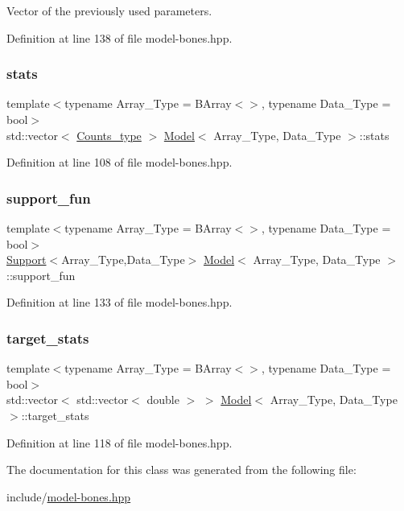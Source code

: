 Vector of the previously used parameters. 



Definition at line 138 of file model-\/bones.\+hpp.

\mbox{\label{class_model_a1816b0dd69226394643dc31916c8645e}} 
\subsubsection{\texorpdfstring{stats}{stats}}
{\footnotesize\ttfamily template$<$typename Array\+\_\+\+Type  = B\+Array$<$$>$, typename Data\+\_\+\+Type  = bool$>$ \\
std\+::vector$<$ \hyperlink{typedefs_8hpp_aee40fa17c1fddb63dd1f2b1470ade95b}{Counts\+\_\+type} $>$ \hyperlink{class_model}{Model}$<$ Array\+\_\+\+Type, Data\+\_\+\+Type $>$\+::stats}



Definition at line 108 of file model-\/bones.\+hpp.

\mbox{\label{class_model_a192302b6d7402bd4ef6edae623074ad0}} 
\subsubsection{\texorpdfstring{support\+\_\+fun}{support\_fun}}
{\footnotesize\ttfamily template$<$typename Array\+\_\+\+Type  = B\+Array$<$$>$, typename Data\+\_\+\+Type  = bool$>$ \\
\hyperlink{class_support}{Support}$<$Array\+\_\+\+Type,Data\+\_\+\+Type$>$ \hyperlink{class_model}{Model}$<$ Array\+\_\+\+Type, Data\+\_\+\+Type $>$\+::support\+\_\+fun}



Definition at line 133 of file model-\/bones.\+hpp.

\mbox{\label{class_model_ab0f4642a2d4602fabb6774914b7dbd39}} 
\subsubsection{\texorpdfstring{target\+\_\+stats}{target\_stats}}
{\footnotesize\ttfamily template$<$typename Array\+\_\+\+Type  = B\+Array$<$$>$, typename Data\+\_\+\+Type  = bool$>$ \\
std\+::vector$<$ std\+::vector$<$ double $>$ $>$ \hyperlink{class_model}{Model}$<$ Array\+\_\+\+Type, Data\+\_\+\+Type $>$\+::target\+\_\+stats}



Definition at line 118 of file model-\/bones.\+hpp.



The documentation for this class was generated from the following file\+:\begin{DoxyCompactItemize}
\item 
include/\hyperlink{model-bones_8hpp}{model-\/bones.\+hpp}\end{DoxyCompactItemize}
